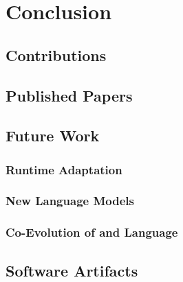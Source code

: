 
\chapter{Conclusion}
\minitoc
\introduction

\section{Contributions}

\section{Published Papers}

\section{Future Work}

\subsection{Runtime Adaptation}

\subsection{New Language Models}

\subsection{Co-Evolution of \VM and Language}

\section{Software Artifacts}


